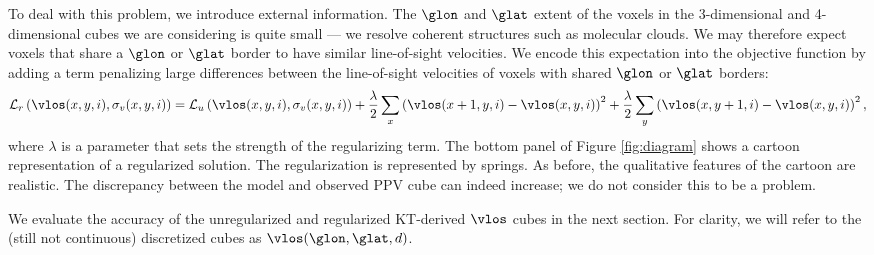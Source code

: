 To deal with this problem, we introduce external information.
The $\glon$ and $\glat$ extent of the voxels in the 3-dimensional and 4-dimensional cubes we are considering is quite small --- we resolve coherent structures such as molecular clouds. 
We may therefore expect voxels that share a $\glon$ or $\glat$ border to have similar line-of-sight velocities.
We encode this expectation into the objective function by adding a term penalizing large differences between the line-of-sight velocities of voxels with shared $\glon$ or $\glat$ borders:
\begin{equation}
  \label{eqn:obj_reg}
  \mathcal{L}_r\left(\vlos(x, y, i), \sigma_v(x, y, i) \right) = 
  \mathcal{L}_u \left(\vlos(x, y, i), \sigma_v(x, y, i) \right) 
  + \frac{\lambda}{2} \sum_{x} \left( \vlos(x + 1, y, i) - \vlos(x, y, i) \right)^2
  + \frac{\lambda}{2} \sum_{y} \left( \vlos(x, y + 1, i) - \vlos(x, y, i) \right)^2,
\end{equation}
where $\lambda$ is a parameter that sets the strength of the regularizing term. 
The bottom panel of Figure \ref{fig:diagram} shows a cartoon representation of a regularized solution. 
The regularization is represented by springs. 
As before, the qualitative features of the cartoon are realistic. 
The discrepancy between the model and observed PPV cube can indeed increase; we do not consider this to be a problem. 

We evaluate the accuracy of the unregularized and regularized KT-derived $\vlos$ cubes in the next section. 
For clarity, we will refer to the (still not continuous) discretized cubes as $\vlos(\glon, \glat, d)$. 



